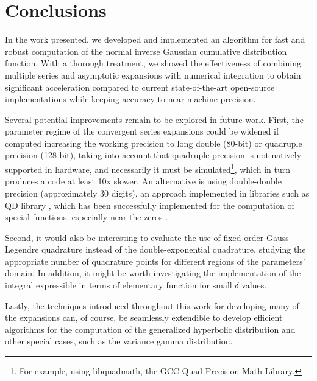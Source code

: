 \documentclass[10pt,a4paper,oneside]{article}
\numberwithin{equation}{section}
\begin{document}
\section{Conclusions}
In the work presented, we developed and implemented an algorithm for fast and robust computation of the normal inverse Gaussian cumulative distribution function.
With a thorough treatment, we showed the effectiveness of combining multiple series and asymptotic expansions with numerical integration to obtain significant
acceleration compared to current state-of-the-art open-source implementations while keeping accuracy to near machine precision.

Several potential improvements remain to be explored in future work. 
First, the parameter regime of the convergent series expansions could be widened if computed increasing the working precision to long double (80-bit) or quadruple precision (128 bit), taking into account that quadruple precision is not natively supported in hardware, and necessarily it must be simulated\footnote{For example, using libquadmath, the GCC Quad-Precision Math Library.}, which in turn produces a code at least 10x slower. An alternative is using double-double precision (approximately 30 digits), an approach implemented in libraries such as QD library \cite{Hida2001}, which has been successfully implemented for the computation of special functions, especially near the zeros \cite{Navas-Palencia2018a}. 

Second, it would also be interesting to evaluate the use of fixed-order Gauss-Legendre quadrature instead of the double-exponential quadrature, studying the appropriate number of quadrature points for different regions of the parameters' domain. In addition, it might be worth investigating the implementation of the integral expressible in terms of elementary function for small $\delta$ values. 

Lastly, the techniques introduced throughout this work for developing many of the expansions can, of course, be seamlessly extendible to develop efficient algorithms for the computation of the generalized hyperbolic distribution and other special cases, such as the variance gamma distribution.
\end{document}
